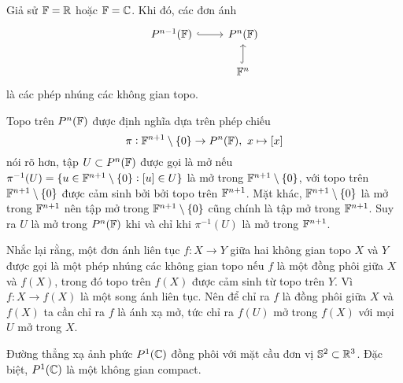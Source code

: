 \begin{prop}
    Giả sử $\mathbb{F} = \mathbb{R}$ hoặc $\mathbb{F} = \mathbb{C}$. Khi đó, các đơn ánh
        \[\begin{tikzcd}
        	P^{n-1}(\F) & P^n(\F) \\
        	& \F^n
        	\arrow[hook, from=1-1, to=1-2]
        	\arrow[hook, from=2-2, to=1-2]
        \end{tikzcd}\]
        là các phép nhúng các không gian topo.
\end{prop}
\begin{remark*}
    Topo trên $P^n(\mathbb{F})$ được định nghĩa dựa trên phép chiếu
    \[\pi: \mathbb{F}^{n+1}\setminus\{0\} \to P^n(\mathbb{F}),~x\mapsto [x]\]
    nói rõ hơn, tập $U \subset P^{n}(\mathbb{F})$ được gọi là mở nếu $\pi^{-1}(U) = \{u \in \mathbb{F}^{n+1}\setminus\{0\}: [u] \in U\}$ là mở trong $\mathbb{F}^{n+1}\setminus\{0\}$, với topo trên $\mathbb{F}^{n+1}\setminus\{0\}$ được cảm sinh bởi bởi topo trên $\mathbb{F}^{n+1}$. Mặt khác, $\mathbb{F}^{n+1}\setminus\{0\}$ là mở trong $\mathbb{F}^{n+1}$ nên tập mở trong $\mathbb{F}^{n+1}\setminus\{0\}$ cũng chính là tập mở trong $\mathbb{F}^{n+1}$.
    Suy ra $U$ là mở trong $P^n(\mathbb{F})$ khi và chỉ khi $\pi^{-1}(U)$ là mở trong $\mathbb{F}^{n+1}$.
    
    Nhắc lại rằng, một đơn ánh liên tục $f:X\to Y$ giữa hai không gian topo $X$ và $Y$ được gọi là một phép nhúng các không gian topo nếu $f$ là một đồng phôi giữa $X$ và $f(X)$, trong đó topo trên $f(X)$ được cảm sinh từ topo trên $Y$. Vì $f: X \to f(X)$ là một song ánh liên tục. Nên để chỉ ra $f$ là đồng phôi giữa $X$ và $f(X)$ ta cần chỉ ra $f$ là ánh xạ mở, tức chỉ ra $f(U)$ mở trong $f(X)$ với mọi $U$ mở trong $X$.
\end{remark*}

\begin{prop}

    Đường thẳng xạ ảnh phức $P^1(\mathbb{C})$ đồng phôi với mặt cầu đơn vị $\mathbb{S}^2 \subset \mathbb{R}^3$. Đặc biệt, $P^1(\mathbb{C})$ là một không gian compact.
    
\end{prop}
    
